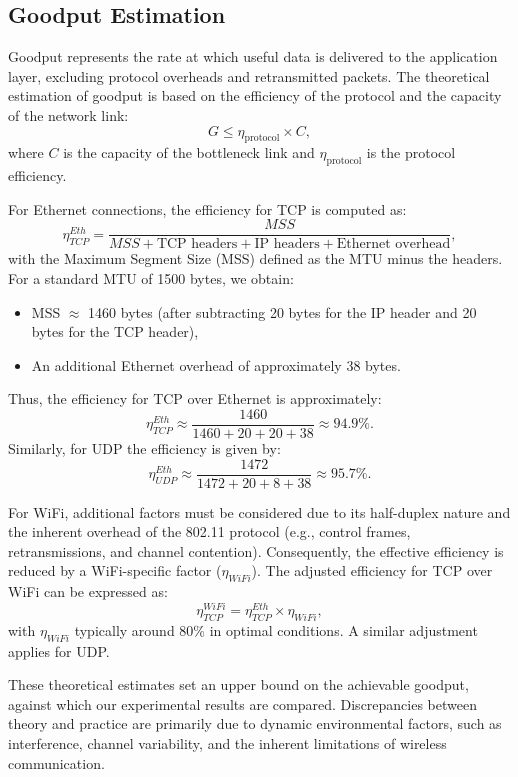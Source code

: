 \subsection{Goodput Estimation} \label{subsec:goodput-estimation}

Goodput represents the rate at which useful data is delivered to the application layer, excluding protocol overheads and retransmitted packets. The theoretical estimation of goodput is based on the efficiency of the protocol and the capacity of the network link:
\[
G \leq \eta_{\text{protocol}} \times C,
\]
where \(C\) is the capacity of the bottleneck link and \(\eta_{\text{protocol}}\) is the protocol efficiency.

For Ethernet connections, the efficiency for TCP is computed as:
\[
\eta_{TCP}^{Eth} = \frac{MSS}{MSS + \text{TCP headers} + \text{IP headers} + \text{Ethernet overhead}},
\]
with the Maximum Segment Size (MSS) defined as the MTU minus the headers. For a standard MTU of 1500 bytes, we obtain:
\begin{itemize}
    \item MSS \(\approx\) 1460 bytes (after subtracting 20 bytes for the IP header and 20 bytes for the TCP header),
    \item An additional Ethernet overhead of approximately 38 bytes.
\end{itemize}
Thus, the efficiency for TCP over Ethernet is approximately:
\[
\eta_{TCP}^{Eth} \approx \frac{1460}{1460 + 20 + 20 + 38} \approx 94.9\%.
\]
Similarly, for UDP the efficiency is given by:
\[
\eta_{UDP}^{Eth} \approx \frac{1472}{1472 + 20 + 8 + 38} \approx 95.7\%.
\]

For WiFi, additional factors must be considered due to its half-duplex nature and the inherent overhead of the 802.11 protocol (e.g., control frames, retransmissions, and channel contention). Consequently, the effective efficiency is reduced by a WiFi-specific factor (\(\eta_{WiFi}\)). The adjusted efficiency for TCP over WiFi can be expressed as:
\[
\eta_{TCP}^{WiFi} = \eta_{TCP}^{Eth} \times \eta_{WiFi},
\]
with \(\eta_{WiFi}\) typically around 80\% in optimal conditions. A similar adjustment applies for UDP.

These theoretical estimates set an upper bound on the achievable goodput, against which our experimental results are compared. Discrepancies between theory and practice are primarily due to dynamic environmental factors, such as interference, channel variability, and the inherent limitations of wireless communication.

